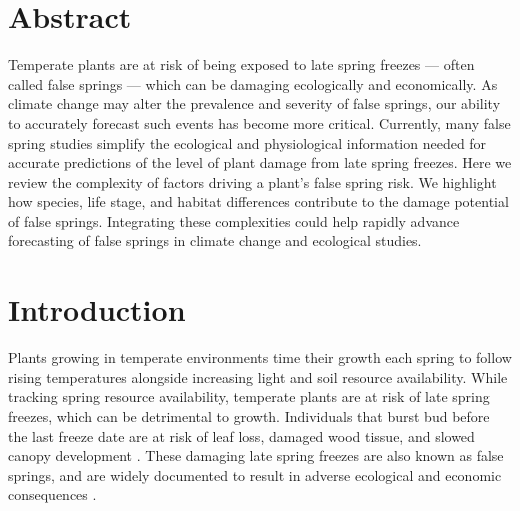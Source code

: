 \documentclass{article}\usepackage[]{graphicx}\usepackage[]{color}
\begin{document}
\section{Abstract}
Temperate plants are at risk of being exposed to late spring freezes --- often called false springs --- which can be damaging ecologically and economically. As climate change may alter the prevalence and severity of false springs, our ability to accurately forecast such events has become more critical. Currently, many false spring studies simplify the ecological and physiological information needed for accurate predictions of the level of plant damage from late spring freezes. Here we review the complexity of factors driving a plant's false spring risk. We highlight how species, life stage, and habitat differences contribute to the damage potential of false springs. %
Integrating these complexities could help rapidly advance forecasting of false springs in climate change and ecological studies.

\section{Introduction}

Plants growing in temperate environments time their growth each spring to follow rising temperatures alongside increasing light and soil resource availability. While tracking spring resource availability, temperate plants are at risk of late spring freezes, which can be detrimental to growth. Individuals that burst bud before the last freeze date are at risk of leaf loss, damaged wood tissue, and slowed canopy development \citep{Gu2008, Hufkens2012}. These damaging late spring freezes are also known as false springs, and are widely documented to result in adverse ecological and economic consequences \citep{Knudson2012, Ault2013}.
\end{document}
